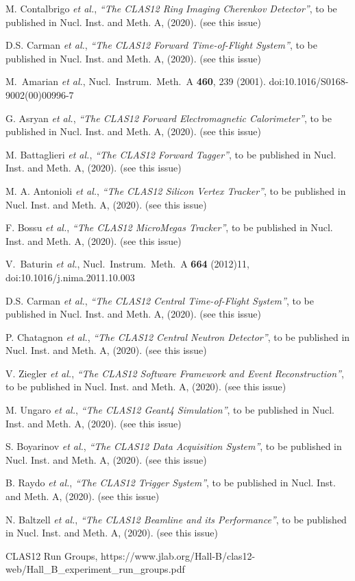 \documentclass[final,3p,twocolumn]{elsarticle}
\begin{document}
\begin{thebibliography}{99}
M. Contalbrigo {\it et al.}, {\it ``The CLAS12 Ring Imaging Cherenkov Detector''}, to be published in Nucl. Inst.
and Meth. A, (2020). (see this issue)

D.S. Carman {\it et al.}, {\it ``The CLAS12 Forward Time-of-Flight System''}, to be published in Nucl. Inst.
and Meth. A, (2020). (see this issue)

  M.~Amarian {\it et al.},
  Nucl.\ Instrum.\ Meth.\ A {\bf 460}, 239 (2001).
  doi:10.1016/S0168-9002(00)00996-7

G. Asryan {\it et al.}, {\it ``The CLAS12 Forward Electromagnetic Calorimeter''}, to be published in Nucl. Inst.
and Meth. A, (2020). (see this issue)

M. Battaglieri {\it et al.}, {\it ``The CLAS12 Forward Tagger''}, to be published in Nucl. Inst.
and Meth. A, (2020). (see this issue)

M. A. Antonioli {\it et al.}, {\it ``The CLAS12 Silicon Vertex Tracker''}, to be published in Nucl. Inst.
and Meth. A, (2020). (see this issue)

F. Bossu {\it et al.}, {\it ``The CLAS12 MicroMegas Tracker''}, to be published in Nucl. Inst.
and Meth. A, (2020). (see this issue)

  V.~Baturin {\it et al.},
  Nucl.\ Instrum.\ Meth.\ A {\bf 664} (2012)11, doi:10.1016/j.nima.2011.10.003

D.S. Carman {\it et al.}, {\it ``The CLAS12 Central Time-of-Flight System''}, to be published in Nucl. Inst.
and Meth. A, (2020). (see this issue)

P. Chatagnon {\it et al.}, {\it ``The CLAS12 Central Neutron Detector''}, to be published in Nucl. Inst.
and Meth. A, (2020). (see this issue)

  V. Ziegler {\it et al.}, {\it ``The CLAS12 Software Framework and Event Reconstruction''}, to be published in
  Nucl. Inst. and Meth. A, (2020). (see this issue)

M. Ungaro {\it et al.}, {\it ``The CLAS12 Geant4 Simulation''}, to be published in Nucl. Inst.
and Meth. A, (2020). (see this issue)

S. Boyarinov {\it et al.}, {\it ``The CLAS12 Data Acquisition System''}, to be published in Nucl. Inst.
and Meth. A, (2020). (see this issue)

B. Raydo {\it et al.}, {\it ``The CLAS12 Trigger System''}, to be published in Nucl. Inst. and Meth. A, (2020).
(see this issue)

N. Baltzell {\it et al.}, {\it ``The CLAS12 Beamline and its Performance''}, to be published in Nucl. Inst.
and Meth. A, (2020). (see this issue)

CLAS12 Run Groups, https://www.jlab.org/Hall-B/clas12-web/Hall\_B\_experiment\_run\_groups.pdf

\end{thebibliography}

\end{document}
